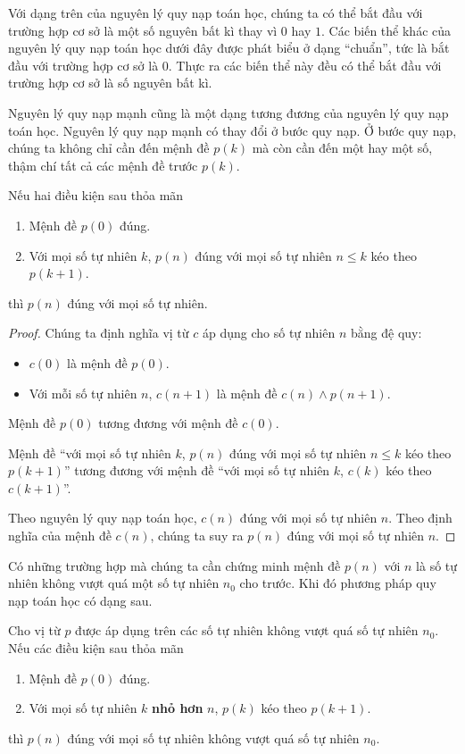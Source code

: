 Với dạng trên của nguyên lý quy nạp toán học, chúng ta có thể bắt đầu với trường hợp cơ sở là một số nguyên bất kì thay vì $0$ hay $1$. Các biến thể khác của nguyên lý quy nạp toán học dưới đây được phát biểu ở dạng ``chuẩn'', tức là bắt đầu với trường hợp cơ sở là $0$. Thực ra các biến thể này đều có thể bắt đầu với trường hợp cơ sở là số nguyên bất kì.

Nguyên lý quy nạp mạnh cũng là một dạng tương đương của nguyên lý quy nạp toán học. Nguyên lý quy nạp mạnh có thay đổi ở bước quy nạp. Ở bước quy nạp, chúng ta không chỉ cần đến mệnh đề $p(k)$ mà còn cần đến một hay một số, thậm chí tất cả các mệnh đề trước $p(k)$.
\begin{theorem}
    Nếu hai điều kiện sau thỏa mãn
    \begin{enumerate}[label={(\roman*)}]
        \item Mệnh đề $p(0)$ đúng.
        \item Với mọi số tự nhiên $k$, $p(n)$ đúng với mọi số tự nhiên $n\leq k$ kéo theo $p(k+1)$.
    \end{enumerate}

    thì $p(n)$ đúng với mọi số tự nhiên.
\end{theorem}

\begin{proof}
    Chúng ta định nghĩa vị từ $c$ áp dụng cho số tự nhiên $n$ bằng đệ quy:
    \begin{itemize}
        \item $c(0)$ là mệnh đề $p(0)$.
        \item Với mỗi số tự nhiên $n$, $c(n+1)$ là mệnh đề $c(n)\wedge p(n+1)$.
    \end{itemize}

    Mệnh đề $p(0)$ tương đương với mệnh đề $c(0)$.

    Mệnh đề ``với mọi số tự nhiên $k$, $p(n)$ đúng với mọi số tự nhiên $n\leq k$ kéo theo $p(k+1)$'' tương đương với mệnh đề ``với mọi số tự nhiên $k$, $c(k)$ kéo theo $c(k+1)$''.

    Theo nguyên lý quy nạp toán học, $c(n)$ đúng với mọi số tự nhiên $n$. Theo định nghĩa của mệnh đề $c(n)$, chúng ta suy ra $p(n)$ đúng với mọi số tự nhiên $n$.
\end{proof}

Có những trường hợp mà chúng ta cần chứng minh mệnh đề $p(n)$ với $n$ là số tự nhiên không vượt quá một số tự nhiên $n_{0}$ cho trước. Khi đó phương pháp quy nạp toán học có dạng sau.
\begin{theorem}
    Cho vị từ $p$ được áp dụng trên các số tự nhiên không vượt quá số tự nhiên $n_{0}$. Nếu các điều kiện sau thỏa mãn
    \begin{enumerate}[label={(\roman*)}]
        \item Mệnh đề $p(0)$ đúng.
        \item Với mọi số tự nhiên $k$ \textbf{nhỏ hơn} $n$, $p(k)$ kéo theo $p(k+1)$.
    \end{enumerate}

    thì $p(n)$ đúng với mọi số tự nhiên không vượt quá số tự nhiên $n_{0}$.
\end{theorem}

